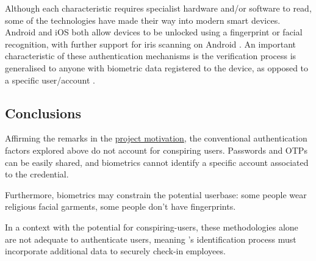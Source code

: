 Although each characteristic requires specialist hardware
and/or software to read, some of the technologies have made
their way into modern smart devices.
Android and iOS both allow devices to be unlocked using a
fingerprint or facial recognition, with further support for
iris scanning on Android \parencite{androidBiometrics,
  touchId, faceId}.
An important characteristic of these authentication
mechanisms is the verification process is generalised to
anyone with biometric data registered to the device, as
opposed to a specific user/account \parencite[][Return
  value of getAuthenticationType()]
{androidBiometricAuthResult}.

\subsection{Conclusions}

Affirming the remarks in the
\hyperref[s:motivation]{project motivation}, the
conventional authentication factors explored above do not
account for conspiring users.
Passwords and OTPs can be easily shared, and biometrics
cannot identify a specific account associated to the
credential.

Furthermore, biometrics may constrain the potential
userbase: some people wear religious facial garments, some
people don't have fingerprints.

In a context with the potential for \gls{conspiring-users},
these methodologies alone are not adequate to authenticate
users, meaning \projectname{}'s identification process must
incorporate additional data to securely check-in employees.
